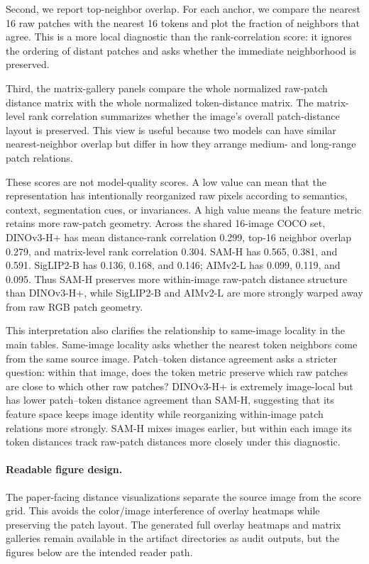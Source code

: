 \documentclass{article}
\newcommand{\dataset}[1]{\textsc{#1}}
\begin{document}
Second, we report top-neighbor overlap. For each anchor, we compare the nearest 16 raw patches with the nearest 16 tokens and plot the fraction of neighbors that agree. This is a more local diagnostic than the rank-correlation score: it ignores the ordering of distant patches and asks whether the immediate neighborhood is preserved.

Third, the matrix-gallery panels compare the whole normalized raw-patch distance matrix with the whole normalized token-distance matrix. The matrix-level rank correlation summarizes whether the image's overall patch-distance layout is preserved. This view is useful because two models can have similar nearest-neighbor overlap but differ in how they arrange medium- and long-range patch relations.

These scores are not model-quality scores. A low value can mean that the representation has intentionally reorganized raw pixels according to semantics, context, segmentation cues, or invariances. A high value means the feature metric retains more raw-patch geometry. Across the shared 16-image \dataset{COCO} set, DINOv3-H+ has mean distance-rank correlation 0.299, top-16 neighbor overlap 0.279, and matrix-level rank correlation 0.304. SAM-H has 0.565, 0.381, and 0.591. SigLIP2-B has 0.136, 0.168, and 0.146; AIMv2-L has 0.099, 0.119, and 0.095. Thus SAM-H preserves more within-image raw-patch distance structure than DINOv3-H+, while SigLIP2-B and AIMv2-L are more strongly warped away from raw RGB patch geometry.

This interpretation also clarifies the relationship to same-image locality in the main tables. Same-image locality asks whether the nearest token neighbors come from the same source image. Patch--token distance agreement asks a stricter question: within that image, does the token metric preserve which raw patches are close to which other raw patches? DINOv3-H+ is extremely image-local but has lower patch--token distance agreement than SAM-H, suggesting that its feature space keeps image identity while reorganizing within-image patch relations more strongly. SAM-H mixes images earlier, but within each image its token distances track raw-patch distances more closely under this diagnostic.

\paragraph{Readable figure design.}
The paper-facing distance visualizations separate the source image from the score grid. This avoids the color/image interference of overlay heatmaps while preserving the patch layout. The generated full overlay heatmaps and matrix galleries remain available in the artifact directories as audit outputs, but the figures below are the intended reader path.
\end{document}
